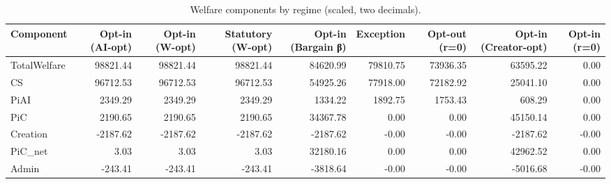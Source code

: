\begin{table}[!ht]
\centering
\caption{Welfare components by regime (scaled, two decimals).}
\label{tab:welfare_components}
\begin{tabular}{lrrrrrrrr}
\toprule
Component & Opt-in (AI-opt) & Opt-in (W-opt) & Statutory (W-opt) & Opt-in (Bargain β) & Exception & Opt-out (r=0) & Opt-in (Creator-opt) & Opt-in (r=0) \\
\midrule
TotalWelfare & 98821.44 & 98821.44 & 98821.44 & 84620.99 & 79810.75 & 73936.35 & 63595.22 & 0.00 \\
CS & 96712.53 & 96712.53 & 96712.53 & 54925.26 & 77918.00 & 72182.92 & 25041.10 & 0.00 \\
PiAI & 2349.29 & 2349.29 & 2349.29 & 1334.22 & 1892.75 & 1753.43 & 608.29 & 0.00 \\
PiC & 2190.65 & 2190.65 & 2190.65 & 34367.78 & 0.00 & 0.00 & 45150.14 & 0.00 \\
Creation & -2187.62 & -2187.62 & -2187.62 & -2187.62 & -0.00 & -0.00 & -2187.62 & -0.00 \\
PiC_net & 3.03 & 3.03 & 3.03 & 32180.16 & 0.00 & 0.00 & 42962.52 & 0.00 \\
Admin & -243.41 & -243.41 & -243.41 & -3818.64 & -0.00 & -0.00 & -5016.68 & -0.00 \\
\bottomrule
\end{tabular}

\end{table}
